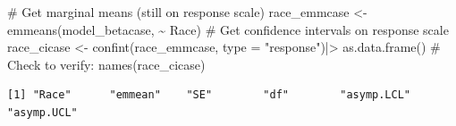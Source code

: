 \documentclass[
  letterpaper,
  DIV=11,
  numbers=noendperiod]{scrartcl}
\newenvironment{Shaded}{\begin{snugshade}}{\end{snugshade}}
\newcommand{\AttributeTok}[1]{\textcolor[rgb]{0.40,0.45,0.13}{#1}}
\newcommand{\CommentTok}[1]{\textcolor[rgb]{0.37,0.37,0.37}{#1}}
\newcommand{\FunctionTok}[1]{\textcolor[rgb]{0.28,0.35,0.67}{#1}}
\newcommand{\NormalTok}[1]{\textcolor[rgb]{0.00,0.23,0.31}{#1}}
\newcommand{\OtherTok}[1]{\textcolor[rgb]{0.00,0.23,0.31}{#1}}
\newcommand{\SpecialCharTok}[1]{\textcolor[rgb]{0.37,0.37,0.37}{#1}}
\newcommand{\StringTok}[1]{\textcolor[rgb]{0.13,0.47,0.30}{#1}}
\begin{document}
\begin{Shaded}
\begin{Highlighting}[]
\CommentTok{\# Get marginal means (still on response scale)}
\NormalTok{race\_emmcase }\OtherTok{\textless{}{-}} \FunctionTok{emmeans}\NormalTok{(model\_betacase, }\SpecialCharTok{\textasciitilde{}}\NormalTok{ Race)}
\CommentTok{\# Get confidence intervals on response scale}
\NormalTok{race\_cicase }\OtherTok{\textless{}{-}} \FunctionTok{confint}\NormalTok{(race\_emmcase, }\AttributeTok{type =} \StringTok{"response"}\NormalTok{)}\SpecialCharTok{|\textgreater{}}
  \FunctionTok{as.data.frame}\NormalTok{()}
\CommentTok{\# Check to verify:}
\FunctionTok{names}\NormalTok{(race\_cicase)}
\end{Highlighting}
\end{Shaded}

\begin{verbatim}
[1] "Race"      "emmean"    "SE"        "df"        "asymp.LCL" "asymp.UCL"
\end{verbatim}
\end{document}
